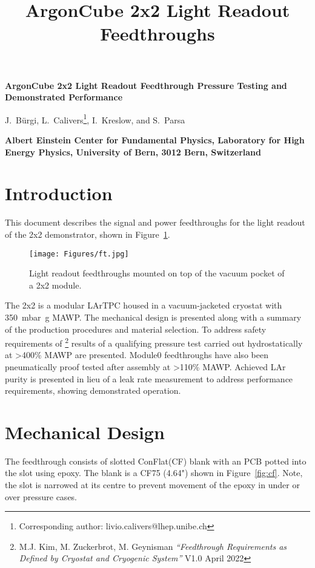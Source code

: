 \documentclass[a4paper]{article}
\title{ArgonCube 2x2 Light Readout Feedthroughs}%
\begin{document}
\begin{center}
	
	{\Large \bf ArgonCube 2x2 Light Readout Feedthrough Pressure Testing and Demonstrated Performance} 
	\vspace*{0.5cm}
	\setcounter{footnote}{0}  
	\def\A{\kern+.6ex\lower.42ex\hbox{$\scriptstyle \iota$}\kern-1.20ex a}
	\def\E{\kern+.5ex\lower.42ex\hbox{$\scriptstyle \iota$}\kern-1.10ex e}
	\small
	\newcommand{\Aname}[2]{#1}
	\def\titlefoot#1{\vspace{-0.01cm}\begin{center}{\bf #1}\end{center}}
		
	\Aname{J.~Bürgi}{Bern},
	\Aname{L.~Calivers\footnote{Corresponding author: livio.calivers@lhep.unibe.ch}}{Bern},
	\Aname{I.~Kreslow}{Bern}, and
	\Aname{S.~Parsa}{Bern}
	
	\titlefoot{Albert Einstein Center for Fundamental Physics, Laboratory for High Energy Physics, University of Bern, 3012 Bern, Switzerland\label{Bern}}
	
	
\end{center}
\section{Introduction}
This document describes the signal and power feedthroughs for the light readout of the 2x2 demonstrator, shown in Figure~\ref{fig:ft}.
\begin{figure}[htbp]
	\centering
	\texttt{[image: Figures/ft.jpg]}
	\caption{Light readout feedthroughs mounted on top of the vacuum pocket of a 2x2 module.}
	\label{fig:ft}
\end{figure}


The 2x2 is a modular LArTPC housed in a vacuum-jacketed cryostat with \SI{350}{\milli\bar\g} MAWP.
The mechanical design is presented along with a summary of the production procedures and material selection. 
To address safety requirements of \footnote{M.J. Kim, M. Zuckerbrot, M. Geynisman \textit{``Feedthrough Requirements as Defined by Cryostat and Cryogenic System''} V1.0 April 2022} results of a qualifying pressure test carried out hydrostatically at >400\% MAWP are presented.
Module0 feedthroughs have also been pneumatically proof tested after assembly at >110\% MAWP.  
Achieved LAr purity is presented in lieu of a leak rate measurement to address performance requirements, showing demonstrated operation.     

\section{Mechanical Design}
The feedthrough consists of slotted ConFlat\textsuperscript{\textregistered}(CF) blank with an PCB potted into the slot using epoxy.
The blank is a CF75 (4.64") shown in Figure~\ref{fig:cf}.
Note, the slot is narrowed at its centre to prevent movement of the epoxy in under or over pressure cases. 
\end{document}
